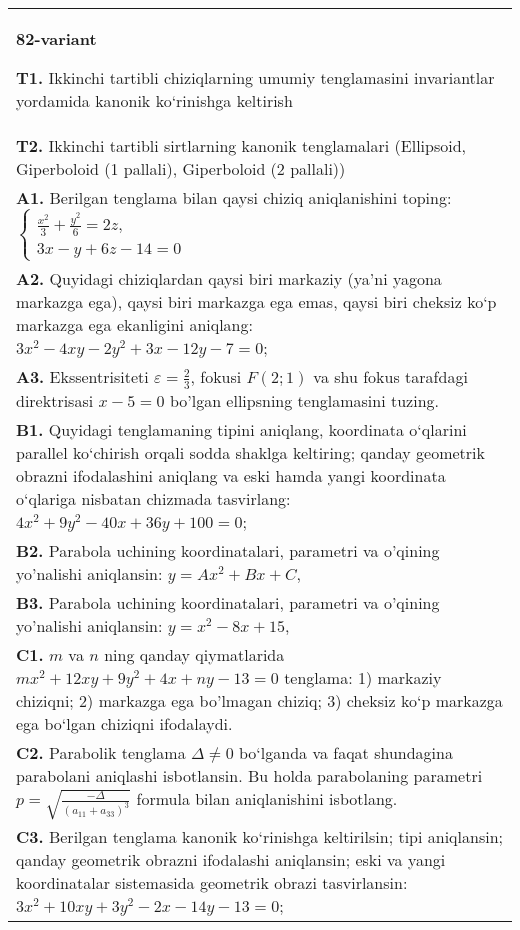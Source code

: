 \documentclass{article}
\begin{document}
\begin{tabular}{m{17cm}}
\textbf{82-variant}
\newline

\textbf{T1.} Ikkinchi tartibli chiziqlarning umumiy tenglamasini invariantlar yordamida kanonik ko‘rinishga keltirish \\
\textbf{T2.} Ikkinchi tartibli sirtlarning kanonik tenglamalari (Ellipsoid, Giperboloid (1 pallali), Giperboloid (2 pallali)) \\
\textbf{A1.} Berilgan tenglama bilan qaysi chiziq aniqlanishini toping: $\left\{\begin{array}{l}\frac{x^2}{3}+\frac{y^2}{6}=2 z, \\ 3 x-y+6 z-14=0\end{array}\right.$ \\
\textbf{A2.} Quyidagi chiziqlardan qaysi biri markaziy (ya’ni yagona markazga ega), qaysi biri markazga ega emas, qaysi biri cheksiz ko‘p markazga ega ekanligini aniqlang: $3 x^2-4 x y-2 y^2+3 x-12 y-7=0$; \\
\textbf{A3.} Ekssentrisiteti $\varepsilon=\frac{2}{3}$, fokusi $F(2 ; 1)$ va shu fokus tarafdagi direktrisasi $x-5=0$ bo'lgan ellipsning tenglamasini tuzing. \\
\textbf{B1.} Quyidagi tenglamaning tipini aniqlang, koordinata o‘qlarini parallel ko‘chirish orqali sodda shaklga keltiring; qanday geometrik obrazni ifodalashini aniqlang va eski hamda yangi koordinata o‘qlariga nisbatan chizmada tasvirlang: $4 x^2+9 y^2-40 x+36 y+100=0$; \\
\textbf{B2.} Parabola uchining koordinatalari, parametri va o'qining yo'nalishi aniqlansin: $y=A x^2+B x+C$, \\
\textbf{B3.} Parabola uchining koordinatalari, parametri va o'qining yo'nalishi aniqlansin: $y=x^2-8 x+15$, \\
\textbf{C1.} $m$ va $n$ ning qanday qiymatlarida $m x^2+12 x y+9 y^2+4 x+n y-13=0$ tenglama: 1) markaziy chiziqni; 2) markazga ega bo'lmagan chiziq; 3) cheksiz ko‘p markazga ega bo‘lgan chiziqni ifodalaydi. \\
\textbf{C2.} Parabolik tenglama $\Delta \neq 0$ bo‘lganda va faqat shundagina parabolani aniqlashi isbotlansin. Bu holda parabolaning parametri $p=\sqrt{\frac{-\Delta}{ (a_{11}+a_{33}) ^3}}$ formula bilan aniqlanishini isbotlang. \\
\textbf{C3.} Berilgan tenglama kanonik ko‘rinishga keltirilsin; tipi aniqlansin; qanday geometrik obrazni ifodalashi aniqlansin; eski va yangi koordinatalar sistemasida geometrik obrazi tasvirlansin: $3 x^2+10 x y+3 y^2-2 x-14 y-13=0$; \\

\end{tabular}
\vspace{1cm}
\end{document}
